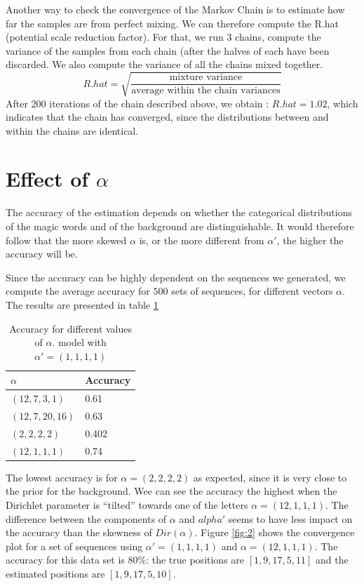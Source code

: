 Another way to check the convergence of the Markov Chain is to estimate how far the samples are from perfect mixing. We can therefore compute the R.hat (potential scale reduction factor). For that, we run 3 chains, compute the variance of the samples from each chain (after the halves of each have been discarded. We also compute the variance of all the chains mixed together. 
\begin{equation*}
R.hat = \sqrt{\frac{\text{mixture variance}}{\text{average within the chain variances}}}
\end{equation*}
After 200 iterations of the chain described above, we obtain : $R.hat = 1.02$, which indicates that the chain has converged, since the distributions between and within the chains are identical.

\section{Effect of $\alpha$}

The accuracy of the estimation depends on whether the categorical distributions of the magic words and of the background are distinguishable. It would therefore follow that the more skewed $\alpha$ is, or the more different from $\alpha'$, the higher the accuracy will be.

Since the accuracy can be highly dependent on the sequences we generated, we compute the average accuracy for $500$ sets of sequences, for different vectors $\alpha$. The results are presented in table \ref{alpha}

\begin{table}[h]
\centering
\caption{Accuracy for different values of $\alpha$. model with $\alpha' = (1, 1,1,1)$}
\label{alpha}
\begin{tabular}{|l|l|}
\hline
$\alpha$              & Accuracy \\ \hline
$(12, 7, 3, 1)$       & 0.61        \\ \hline
$(12, 7, 20, 16)$     & 0.63       \\ \hline
$(2, 2, 2, 2)$        & 0.402       \\ \hline
$(12, 1, 1, 1)$ & 0.74       \\ \hline
\end{tabular}
\end{table}

The lowest accuracy is for $\alpha = (2, 2, 2, 2)$ as expected, since it is very close to the prior for the background. Wee can see the accuracy the highest when the Dirichlet parameter is “tilted” towards one of the letters $\alpha = (12, 1, 1, 1)$. The difference between the components of $\alpha$ and $alpha'$ seems to have less impact on the accuracy than the skewness of $Dir(\alpha)$.
Figure \ref{fig:2} shows the convergence plot for a set of sequences using $\alpha' = (1, 1,1,1)$ and $\alpha = (12, 1, 1, 1)$. The accuracy for this data set is $80\%$: the true positions are $[1,9,17,5,11]$ and the estimated positions are $[1,9,17,5, 10]$.  

